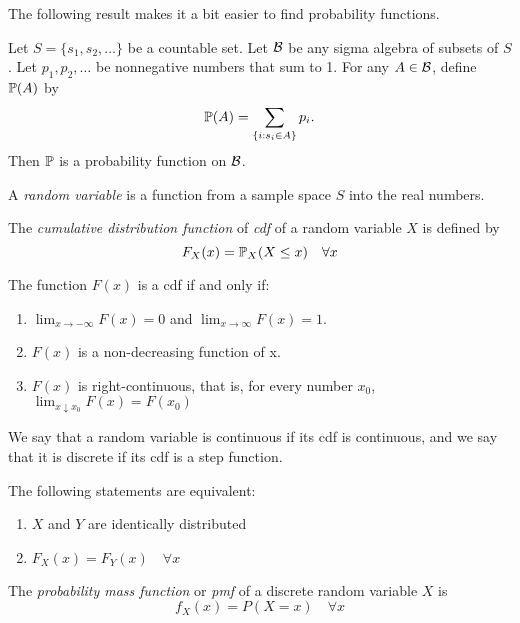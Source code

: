The following result makes it a bit easier to find probability functions.

\begin{theorem}
    Let $S=\{s_1, s_2, \dots\}$ be a countable set. Let $\B{}$ be any sigma algebra of subsets of $S$. Let $p_1, p_2, \dots$ be nonnegative numbers that sum to 1. For any $A \in \B{}$, define $\P{}(A)$ by
    \[
        \P{}(A) = \sum_{\{i: s_i \in A\}} p_i.
    \]
Then $\P{}$ is a probability function on $\B{}$.
\end{theorem}

\begin{definition}
    A \emph{random variable} is a function from a sample space $S$ into the real numbers.
\end{definition}

\begin{definition}[cdf]
    The \emph{cumulative distribution function} of \emph{cdf} of a random variable $X$ is defined by
    \[
        F_X(x) = \P{}_X(X \leq x) \quad \forall x
    \]
\end{definition}

\begin{theorem}
    The function $F(x)$ is a cdf if and only if:
    \begin{enumerate}
        \item $\lim_{x \to - \infty} F(x) = 0$ and $\lim_{x\to\infty} F(x) = 1$.
        \item $F(x)$ is a non-decreasing function of x.
        \item $F(x)$ is right-continuous, that is, for every number $x_0$, $\lim_{x\downarrow x_0} F(x) = F(x_0)$
    \end{enumerate}
\end{theorem}

We say that a random variable is continuous if its cdf is continuous, and we say that it is discrete if its cdf is a step function.

\begin{theorem}
    The following statements are equivalent:
    \begin{enumerate}
        \item $X$ and $Y$ are identically distributed
        \item $F_X(x) = F_Y(x) \quad \forall x$
    \end{enumerate}
\end{theorem}

\begin{definition}
    The \emph{probability mass function} or \emph{pmf} of a discrete random variable $X$ is
    \[
        f_X(x) = P(X=x) \quad \forall x
    \]
\end{definition}

